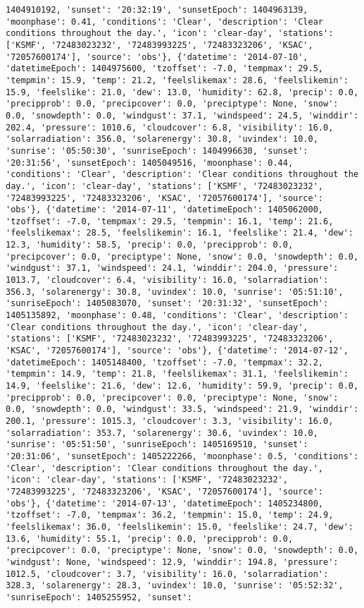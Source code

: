 \documentclass[
  letterpaper,
  DIV=11,
  numbers=noendperiod]{scrartcl}
\begin{document}
\begin{verbatim}
1404910192, 'sunset': '20:32:19', 'sunsetEpoch': 1404963139, 'moonphase': 0.41, 'conditions': 'Clear', 'description': 'Clear conditions throughout the day.', 'icon': 'clear-day', 'stations': ['KSMF', '72483023232', '72483993225', '72483323206', 'KSAC', '72057600174'], 'source': 'obs'}, {'datetime': '2014-07-10', 'datetimeEpoch': 1404975600, 'tzoffset': -7.0, 'tempmax': 29.5, 'tempmin': 15.9, 'temp': 21.2, 'feelslikemax': 28.6, 'feelslikemin': 15.9, 'feelslike': 21.0, 'dew': 13.0, 'humidity': 62.8, 'precip': 0.0, 'precipprob': 0.0, 'precipcover': 0.0, 'preciptype': None, 'snow': 0.0, 'snowdepth': 0.0, 'windgust': 37.1, 'windspeed': 24.5, 'winddir': 202.4, 'pressure': 1010.6, 'cloudcover': 6.8, 'visibility': 16.0, 'solarradiation': 356.0, 'solarenergy': 30.8, 'uvindex': 10.0, 'sunrise': '05:50:30', 'sunriseEpoch': 1404996630, 'sunset': '20:31:56', 'sunsetEpoch': 1405049516, 'moonphase': 0.44, 'conditions': 'Clear', 'description': 'Clear conditions throughout the day.', 'icon': 'clear-day', 'stations': ['KSMF', '72483023232', '72483993225', '72483323206', 'KSAC', '72057600174'], 'source': 'obs'}, {'datetime': '2014-07-11', 'datetimeEpoch': 1405062000, 'tzoffset': -7.0, 'tempmax': 29.5, 'tempmin': 16.1, 'temp': 21.6, 'feelslikemax': 28.5, 'feelslikemin': 16.1, 'feelslike': 21.4, 'dew': 12.3, 'humidity': 58.5, 'precip': 0.0, 'precipprob': 0.0, 'precipcover': 0.0, 'preciptype': None, 'snow': 0.0, 'snowdepth': 0.0, 'windgust': 37.1, 'windspeed': 24.1, 'winddir': 204.0, 'pressure': 1013.7, 'cloudcover': 6.4, 'visibility': 16.0, 'solarradiation': 356.3, 'solarenergy': 30.8, 'uvindex': 10.0, 'sunrise': '05:51:10', 'sunriseEpoch': 1405083070, 'sunset': '20:31:32', 'sunsetEpoch': 1405135892, 'moonphase': 0.48, 'conditions': 'Clear', 'description': 'Clear conditions throughout the day.', 'icon': 'clear-day', 'stations': ['KSMF', '72483023232', '72483993225', '72483323206', 'KSAC', '72057600174'], 'source': 'obs'}, {'datetime': '2014-07-12', 'datetimeEpoch': 1405148400, 'tzoffset': -7.0, 'tempmax': 32.2, 'tempmin': 14.9, 'temp': 21.8, 'feelslikemax': 31.1, 'feelslikemin': 14.9, 'feelslike': 21.6, 'dew': 12.6, 'humidity': 59.9, 'precip': 0.0, 'precipprob': 0.0, 'precipcover': 0.0, 'preciptype': None, 'snow': 0.0, 'snowdepth': 0.0, 'windgust': 33.5, 'windspeed': 21.9, 'winddir': 200.1, 'pressure': 1015.3, 'cloudcover': 3.3, 'visibility': 16.0, 'solarradiation': 353.7, 'solarenergy': 30.6, 'uvindex': 10.0, 'sunrise': '05:51:50', 'sunriseEpoch': 1405169510, 'sunset': '20:31:06', 'sunsetEpoch': 1405222266, 'moonphase': 0.5, 'conditions': 'Clear', 'description': 'Clear conditions throughout the day.', 'icon': 'clear-day', 'stations': ['KSMF', '72483023232', '72483993225', '72483323206', 'KSAC', '72057600174'], 'source': 'obs'}, {'datetime': '2014-07-13', 'datetimeEpoch': 1405234800, 'tzoffset': -7.0, 'tempmax': 36.2, 'tempmin': 15.0, 'temp': 24.9, 'feelslikemax': 36.0, 'feelslikemin': 15.0, 'feelslike': 24.7, 'dew': 13.6, 'humidity': 55.1, 'precip': 0.0, 'precipprob': 0.0, 'precipcover': 0.0, 'preciptype': None, 'snow': 0.0, 'snowdepth': 0.0, 'windgust': None, 'windspeed': 12.9, 'winddir': 194.8, 'pressure': 1012.5, 'cloudcover': 3.7, 'visibility': 16.0, 'solarradiation': 328.3, 'solarenergy': 28.3, 'uvindex': 10.0, 'sunrise': '05:52:32', 'sunriseEpoch': 1405255952, 'sunset': 
\end{verbatim}
\end{document}
